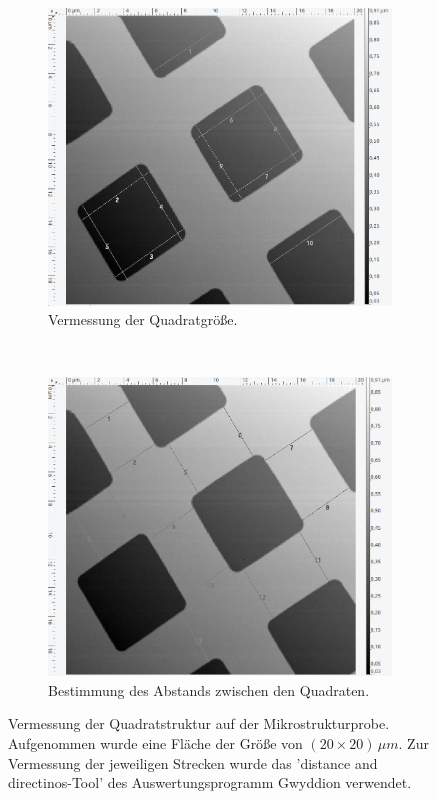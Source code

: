 \begin{figure}[H]
\centering
	\begin{subfigure}[t]{0.45\textwidth}
	\includegraphics[width=\textwidth]{AFM_auswertung/quad_durch_vor.png}
	\caption{Vermessung der Quadratgr\"o{\ss}e.}
	\label{abb:quada}
	\end{subfigure}
	~
	\begin{subfigure}[t]{0.45\textwidth}
	\includegraphics[width=\textwidth]{AFM_auswertung/quad_abb_vor.png}
	\caption{Bestimmung des Abstands zwischen den Quadraten.}
	\label{abb:quadb}
	\end{subfigure}
\caption{Vermessung der Quadratstruktur auf der Mikrostrukturprobe. Aufgenommen wurde eine Fl\"ache der Gr\"o{\ss}e von $(20 \times 20) \, \mu m$. Zur Vermessung der jeweiligen Strecken wurde das 'distance and directinos-Tool' des Auswertungsprogramm Gwyddion verwendet.}
\label{abb:quad}
\end{figure}


